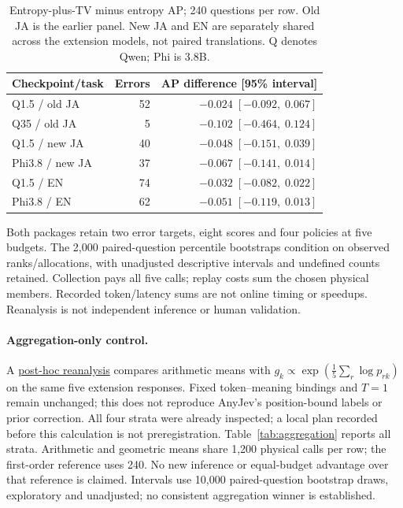 \documentclass[11pt]{article}
\begin{document}
\begin{table}[h]
\centering\small
\begin{tabular}{@{}lrr@{}}
\toprule
Checkpoint/task & Errors & AP difference [95\% interval] \\
\midrule
Q1.5 / old JA & 52 & $-0.024\;[-0.092,\;0.067]$ \\
Q35 / old JA & 5 & $-0.102\;[-0.464,\;0.124]$ \\
Q1.5 / new JA & 40 & $-0.048\;[-0.151,\;0.039]$ \\
Phi3.8 / new JA & 37 & $-0.067\;[-0.141,\;0.014]$ \\
Q1.5 / EN & 74 & $-0.032\;[-0.082,\;0.022]$ \\
Phi3.8 / EN & 62 & $-0.051\;[-0.119,\;0.013]$ \\
\bottomrule
\end{tabular}
\caption{Entropy-plus-TV minus entropy AP; 240 questions per row. Old JA is the earlier panel. New JA and EN are separately shared across the extension models, not paired translations. Q denotes Qwen; Phi is 3.8B.}
\label{tab:diagnostic}
\end{table}

Both packages retain two error targets, eight scores and four policies at five budgets. The 2,000 paired-question percentile bootstraps condition on observed ranks/allocations, with unadjusted descriptive intervals and undefined counts retained. Collection pays all five calls; replay costs sum the chosen physical members. Recorded token/latency sums are not online timing or speedups. Reanalysis is not independent inference or human validation.

\paragraph{Aggregation-only control.}
A \href{https://github.com/UpHash-Network/mini-jev/tree/research/naacl2027-demo/paper/naacl2027/aggregation_control_20261005}{post-hoc reanalysis} compares arithmetic means with $g_k\propto\exp(\frac15\sum_r\log p_{rk})$ on the same five extension responses. Fixed token--meaning bindings and $T=1$ remain unchanged; this does not reproduce AnyJev's position-bound labels or prior correction. All four strata were already inspected; a local plan recorded before this calculation is not preregistration. Table~\ref{tab:aggregation} reports all strata. Arithmetic and geometric means share 1,200 physical calls per row; the first-order reference uses 240. No new inference or equal-budget advantage over that reference is claimed. Intervals use 10,000 paired-question bootstrap draws, exploratory and unadjusted; no consistent aggregation winner is established.
\end{document}

